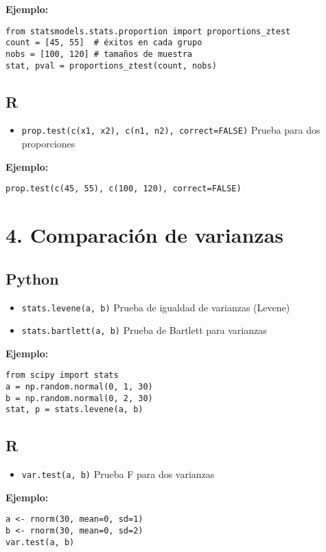 \textbf{Ejemplo:}
\begin{verbatim}
from statsmodels.stats.proportion import proportions_ztest
count = [45, 55]  # éxitos en cada grupo
nobs = [100, 120] # tamaños de muestra
stat, pval = proportions_ztest(count, nobs)
\end{verbatim}

\subsection*{R}
\begin{itemize}
    \item \texttt{prop.test(c(x1, x2), c(n1, n2), correct=FALSE)} \hfill Prueba para dos proporciones
\end{itemize}

\textbf{Ejemplo:}
\begin{verbatim}
prop.test(c(45, 55), c(100, 120), correct=FALSE)
\end{verbatim}

\section*{4. Comparación de varianzas}

\subsection*{Python}
\begin{itemize}
    \item \texttt{stats.levene(a, b)} \hfill Prueba de igualdad de varianzas (Levene)
    \item \texttt{stats.bartlett(a, b)} \hfill Prueba de Bartlett para varianzas
\end{itemize}

\textbf{Ejemplo:}
\begin{verbatim}
from scipy import stats
a = np.random.normal(0, 1, 30)
b = np.random.normal(0, 2, 30)
stat, p = stats.levene(a, b)
\end{verbatim}

\subsection*{R}
\begin{itemize}
    \item \texttt{var.test(a, b)} \hfill Prueba F para dos varianzas
\end{itemize}

\textbf{Ejemplo:}
\begin{verbatim}
a <- rnorm(30, mean=0, sd=1)
b <- rnorm(30, mean=0, sd=2)
var.test(a, b)
\end{verbatim}

